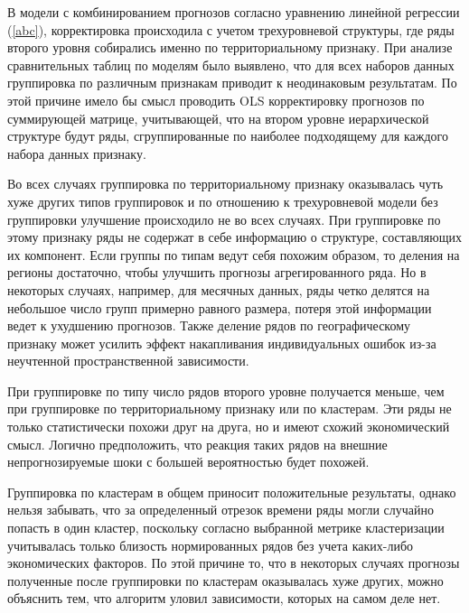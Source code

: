 \documentclass[12pt,a4paper, oneside]{extreport}
\begin{document}
В модели с  комбинированием прогнозов согласно уравнению линейной регрессии (\ref{abc}),
корректировка происходила с учетом 
трехуровневой структуры, где ряды второго уровня собирались  именно по территориальному признаку. При анализе сравнительных таблиц по моделям было выявлено, что для всех наборов данных группировка по различным признакам приводит к неодинаковым результатам. По этой причине  имело бы смысл проводить OLS корректировку прогнозов по суммирующей матрице, учитывающей, что на втором уровне иерархической структуре будут ряды, сгруппированные по наиболее подходящему  для каждого набора данных признаку. 



Во всех случаях группировка по территориальному признаку оказывалась чуть хуже других типов группировок и по отношению к трехуровневой модели без группировки улучшение происходило не во всех случаях.  
При группировке по этому признаку ряды не содержат  в себе информацию о структуре, составляющих их компонент. Если группы по типам ведут себя похожим образом, то деления на регионы  достаточно, чтобы улучшить прогнозы агрегированного ряда.      Но в некоторых случаях, например, для месячных данных,  ряды четко делятся на  небольшое число групп примерно равного размера, потеря этой информации ведет к ухудшению прогнозов.  Также деление рядов по географическому признаку может  усилить эффект накапливания индивидуальных ошибок из-за неучтенной пространственной зависимости. 

При группировке по типу число рядов второго уровне получается меньше, чем при группировке по территориальному признаку или по кластерам.  Эти  ряды не только статистически   похожи друг на друга, но и имеют схожий экономический смысл. Логично предположить, что  реакция таких рядов  на внешние непрогнозируемые шоки с большей вероятностью будет похожей. 

Группировка по кластерам в общем  приносит положительные результаты, однако нельзя забывать, что за определенный отрезок  времени ряды могли случайно попасть в один кластер, поскольку согласно выбранной метрике кластеризации учитывалась только близость нормированных рядов без учета каких-либо экономических факторов. По этой причине то, что  в некоторых случаях  прогнозы полученные после группировки по кластерам оказывалась хуже других, можно объяснить  тем, что  алгоритм  уловил зависимости, которых на самом деле нет.  
\end{document}
